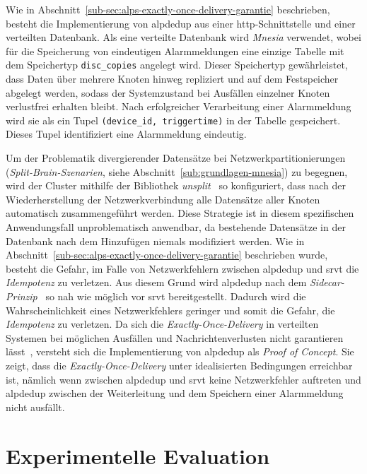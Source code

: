 Wie in Abschnitt~\ref{sub-sec:alps-exactly-once-delivery-garantie} beschrieben, besteht die Implementierung von \gls{alpdedup} aus einer \gls{http}-Schnittstelle und einer verteilten Datenbank. Als eine verteilte Datenbank wird \textit{Mnesia} verwendet, wobei für die Speicherung von eindeutigen Alarmmeldungen eine einzige Tabelle mit dem Speichertyp \texttt{disc\_copies} angelegt wird. Dieser Speichertyp gewährleistet, dass Daten über mehrere Knoten hinweg repliziert und auf dem Festspeicher abgelegt werden, sodass der Systemzustand bei Ausfällen einzelner Knoten verlustfrei erhalten bleibt. Nach erfolgreicher Verarbeitung einer Alarmmeldung wird sie als ein Tupel \texttt{(device\_id, triggertime)} in der Tabelle gespeichert. Dieses Tupel identifiziert eine Alarmmeldung eindeutig.

\newpage

Um der Problematik divergierender Datensätze bei Netzwerkpartitionierungen (\textit{Split-Brain-Szenarien}, siehe Abschnitt~\ref{sub:grundlagen-mnesia}) zu begegnen, wird der Cluster mithilfe der Bibliothek \textit{unsplit}~\citep{unsplit2010} so konfiguriert, dass nach der Wiederherstellung der Netzwerkverbindung alle Datensätze aller Knoten automatisch zusammengeführt werden. Diese Strategie ist in diesem spezifischen Anwendungsfall unproblematisch anwendbar, da bestehende Datensätze in der Datenbank nach dem Hinzufügen niemals modifiziert werden. Wie in Abschnitt~\ref{sub-sec:alps-exactly-once-delivery-garantie} beschrieben wurde, besteht die Gefahr, im Falle von Netzwerkfehlern zwischen \gls{alpdedup} und \gls{srvt} die \textit{Idempotenz} zu verletzen. Aus diesem Grund wird \gls{alpdedup} nach dem \textit{Sidecar-Prinzip}~\citep{burns2018designing} so nah wie möglich vor \gls{srvt} bereitgestellt. Dadurch wird die Wahrscheinlichkeit eines Netzwerkfehlers geringer und somit die Gefahr, die \textit{Idempotenz} zu verletzen. Da sich die \textit{Exactly-Once-Delivery} in verteilten Systemen bei möglichen Ausfällen und Nachrichtenverlusten nicht garantieren lässt~\citep{akkoyunlu1975}, versteht sich die Implementierung von \gls{alpdedup} als \textit{Proof of Concept}. Sie zeigt, dass die \textit{Exactly-Once-Delivery} unter idealisierten Bedingungen erreichbar ist, nämlich wenn zwischen \gls{alpdedup} und \gls{srvt} keine Netzwerkfehler auftreten und \gls{alpdedup} zwischen der Weiterleitung und dem Speichern einer Alarmmeldung nicht ausfällt.

\section{Experimentelle Evaluation}
\label{sub-sec:alps-experimentelle-evaluation}

